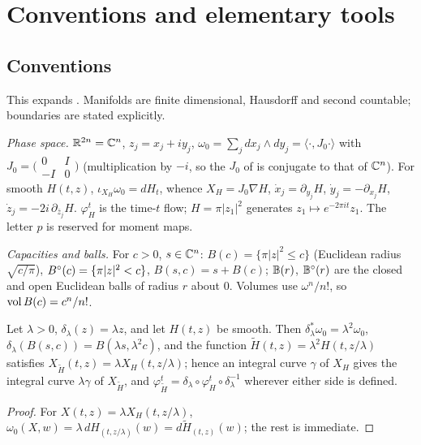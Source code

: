\section{Conventions and elementary tools}\label{sec:pre}

\subsection{Conventions}\label{sec:pre-conventions}

This expands . Manifolds are finite dimensional, Hausdorff and second countable; boundaries are stated explicitly.

\emph{Phase space.} $\mathbb{R}^{2n}=\mathbb{C}^n$, $z_j=x_j+iy_j$, $\omega_0=\sum_jdx_j\wedge dy_j=\langle\cdot,J_0\cdot\rangle$ with $J_0=\bigl(\begin{smallmatrix}0&I\\-I&0\end{smallmatrix}\bigr)$ (multiplication by $-i$, so the $J_0$ of  is conjugate to that of $\mathbb{C}^n$). For smooth $H(t,z)$, $\iota_{X_H}\omega_0=dH_t$, whence $X_H=J_0\nabla H$, $\dot x_j=\partial_{y_j}H$, $\dot y_j=-\partial_{x_j}H$, $\dot z_j=-2i\,\partial_{\bar z_j}H$. $\varphi^t_H$ is the time-$t$ flow; $H=\pi|z_1|^2$ generates $z_1\mapsto e^{-2\pi it}z_1$. The letter $p$ is reserved for moment maps.

\emph{Capacities and balls.} For $c>0$, $s\in\mathbb{C}^n$: $B(c)=\{\pi|z|^2\le c\}$ (Euclidean radius $\sqrt{c/\pi}$), $B^{\circ}(c)=\{\pi|z|^2<c\}$, $B(s,c)=s+B(c)$; $\mathbb{B}(r)$, $\mathbb{B}^\circ(r)$ are the closed and open Euclidean balls of radius $r$ about $0$. Volumes use $\omega^n/n!$, so $\operatorname{vol} B(c)=c^n/n!$.

\begin{lemma}[Dilations]\label{lem:pre-dilation}
Let $\lambda>0$, $\delta_\lambda(z)=\lambda z$, and let $H(t,z)$ be smooth. Then
$\delta_\lambda^*\omega_0=\lambda^2\omega_0$, $\delta_\lambda(B(s,c))=B(\lambda s,\lambda^2c)$, and the function
$\tilde H(t,z)=\lambda^2H(t,z/\lambda)$ satisfies $X_{\tilde H}(t,z)=\lambda X_H(t,z/\lambda)$; hence an integral curve
$\gamma$ of $X_H$ gives the integral curve $\lambda\gamma$ of $X_{\tilde H}$, and
$\varphi^t_{\tilde H}=\delta_\lambda\circ\varphi^t_H\circ\delta_\lambda^{-1}$ wherever either side is defined.
\end{lemma}

\begin{proof}
For $X(t,z)=\lambda X_H(t,z/\lambda)$, $\omega_0(X,w)=\lambda\,dH_{(t,z/\lambda)}(w)=d\tilde H_{(t,z)}(w)$; the rest is immediate.
\end{proof}

